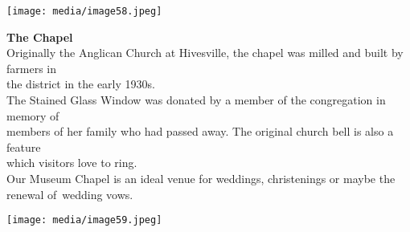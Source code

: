 \texttt{[image: media/image58.jpeg]}

\textbf{The Chapel}\\
Originally the Anglican Church at Hivesville, the chapel was milled and built by farmers in\\
the district in the early 1930s.\\
The Stained Glass Window was donated by a member of the congregation in memory of\\
members of her family who had passed away. The original church bell is also a feature\\
which visitors love to ring.\\
Our Museum Chapel is an ideal venue for weddings, christenings or maybe the renewal of~wedding vows.

\texttt{[image: media/image59.jpeg]}
